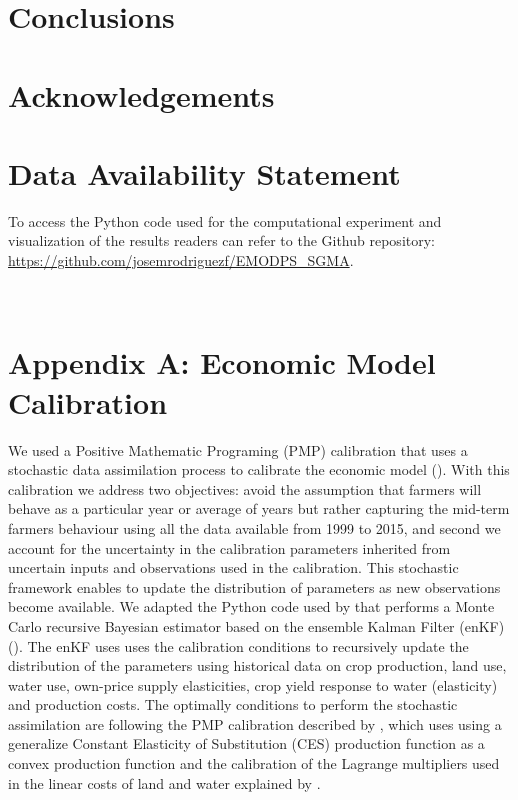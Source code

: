 \documentclass[11pt,a4paper]{article}
\begin{document}
\section{Conclusions}

\section*{Acknowledgements}


\section*{Data Availability Statement}

To access the Python code used for the computational experiment and  visualization of the results readers can refer to the Github repository: \url{https://github.com/josemrodriguezf/EMODPS_SGMA}.

\newpage
\appendix
\renewcommand\thefigure{\thesection.\arabic{figure}} 
\setcounter{figure}{0}  
\renewcommand{\theequation}{\thesection.\arabic{equation}}\
\setcounter{equation}{0} 
\renewcommand{\thetable}{\thesection.\arabic{table}}\
\setcounter{table}{0} 

\section{Appendix A: Economic Model Calibration}

We used a Positive Mathematic Programing (PMP) calibration that uses a stochastic data assimilation process to calibrate the economic model (\cite{maneta_satellite-driven_2020}).  With this calibration we address two objectives: avoid the assumption that farmers will behave as a particular year or average of years but rather capturing the mid-term farmers behaviour using all the data available from 1999 to 2015, and second we account for the uncertainty in the calibration parameters inherited from uncertain inputs and observations used in the calibration. This stochastic framework enables to update the distribution of parameters as new observations become available. We adapted the Python code used by \textcite{maneta_satellite-driven_2020} that performs a Monte Carlo recursive Bayesian estimator based on the ensemble Kalman Filter (enKF) (\cite{evensen_sequential_1994}). The enKF uses uses the calibration conditions to recursively update the distribution of the parameters using historical data on crop production, land use, water use, own-price supply elasticities, crop yield response to water (elasticity) and production costs. The optimally conditions to perform the stochastic assimilation are following the PMP calibration described by \cite{merel_fully_2011}, which uses using a generalize Constant Elasticity of Substitution (CES) production function as a convex production function and the calibration of the Lagrange multipliers used in the linear costs of land and water explained by \textcite{garnache_calibration_2017}. 
\end{document}
